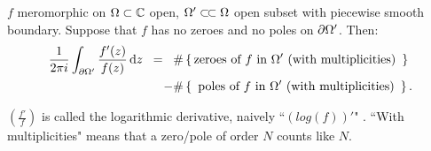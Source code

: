 \begin{theorem}\label{thm:arg-princ}

$f$ meromorphic on $\Omega \subset \mathbb{C}$ open, $\om ' \ssubset \om$ open subset with piecewise smooth boundary. Suppose that $f$ has no zeroes and no poles on $\partial \Omega '$. Then:
\begin{align*}
    \frac{1}{2 \pi i} \int_{\partial \om '} \frac{f'(z)}{f(z)} \dif z \;\; = \;\;\; & \# \set{\text{zeroes of $f$ in $\om '$ (with multiplicities)  } }\\
    -  &\# \set{ \text{ poles of $f$ in $\om '$ (with multiplicities) } }.
\end{align*}

\end{theorem}

\begin{note}
$\left( \frac{f'}{f} \right)$ is called the logarithmic derivative, naively ``$(log(f))'$" . ``With multiplicities" means that a zero/pole of order $N$ counts like $N$.
\end{note}

\begin{center}
\end{center}



